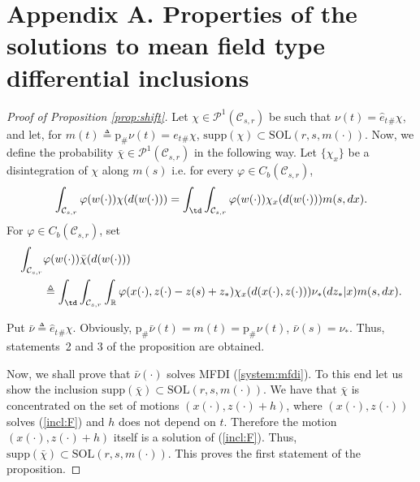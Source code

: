 \documentclass[a4paper,12pt]{article}
\begin{document}
\section*{Appendix A. Properties of the solutions to mean field type differential inclusions}
\setcounter{theorem}{0}
\setcounter{equation}{0}
\renewcommand{\theequation}{A\arabic{equation}}
\begin{proof}[Proof of Proposition \ref{prop:shift}]
	Let $\chi\in\mathcal{P}^1(\mathcal{C}_{s,r})$ be such that $\nu(t)=\hat{e}_t{}_\#\chi$, and let, for $m(t)\triangleq\mathrm{p}_\#\nu(t)=e_t{}_\#\chi$, $\mathrm{supp}(\chi)\subset \mathrm{SOL}(r,s,m(\cdot))$. Now, we define the probability $\bar{\chi}\in\mathcal{P}^1(\mathcal{C}_{s,r})$ in the following way. Let 	 $\{\chi_{x}\}$ be a disintegration of $\chi$ along $m(s)$ i.e. for every $\varphi\in C_b(\mathcal{C}_{s,r})$,
	$$\int_{\mathcal{C}_{s,r}}\varphi(w(\cdot))\chi(d(w(\cdot)))=\int_{\td}\int_{\mathcal{C}_{s,r}}\varphi(w(\cdot))\chi_{x}(d(w(\cdot)))m(s,dx). $$ For $\varphi\in C_b(\mathcal{C}_{s,r})$, set
	\begin{equation*}
	\begin{split}
	\int_{\mathcal{C}_{s,r}}&\varphi(w(\cdot))\bar{\chi}(d(w(\cdot)))\\&\triangleq  \int_{\td}\int_{\mathcal{C}_{s,r}} \int_{\mathbb{R}}\varphi(x(\cdot),z(\cdot)-z(s)+z_*)\chi_{x}(d(x(\cdot),z(\cdot))) \nu_*(dz_*|x)m(s,dx). \end{split}
	\end{equation*}
	
	Put $\bar{\nu}\triangleq \hat{e}_t{}_\#\chi$. Obviously, $\mathrm{p}_\#\bar{\nu}(t)=m(t)=\mathrm{p}_\#\nu(t)$, $\bar{\nu}(s)=\nu_*$. Thus, statements~2 and 3 of the proposition are obtained.
	
	Now, we shall prove that $\bar{\nu}(\cdot)$ solves MFDI (\ref{system:mfdi}). To this end let us show the inclusion $\mathrm{supp}(\bar{\chi})\subset\mathrm{SOL}(r,s,m(\cdot))$. We have that $\bar{\chi}$ is concentrated on the set of motions $(x(\cdot),z(\cdot)+h)$, where $(x(\cdot),z(\cdot))$ solves (\ref{incl:F}) and $h$ does not depend on $t$. Therefore the motion $(x(\cdot),z(\cdot)+h)$ itself is a solution of (\ref{incl:F}). Thus, $\mathrm{supp}(\bar{\chi})\subset\mathrm{SOL}(r,s,m(\cdot))$. This proves the first statement of the proposition.
	

\end{proof}
\end{document}
